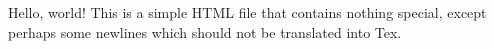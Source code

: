 Hello, world! This is a simple HTML file that contains nothing special,
except perhaps some newlines which should not be translated into Tex.
